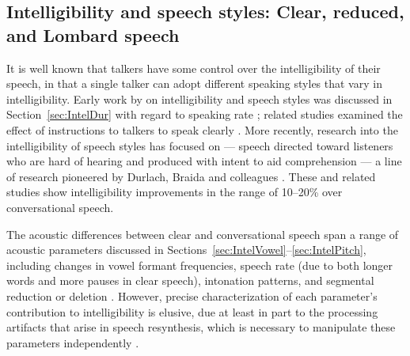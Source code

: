 
\subsection[Intelligibility and speech styles]{Intelligibility and speech styles: Clear, reduced, and Lombard speech\label{sec:SpeechStyle}}
It is well known that talkers have some control over the intelligibility of their speech, in that a single talker can adopt different speaking styles that vary in intelligibility.  Early work by \citeauthor*{Tolhurst1957a} on intelligibility and speech styles was discussed in Section~\ref{sec:IntelDur} with regard to speaking rate \citep{Tolhurst1957a}; related studies examined the effect of instructions to talkers to speak clearly \citep{Tolhurst1954, Tolhurst1955}.  More recently, research into the intelligibility of speech styles has focused on  — speech directed toward listeners who are hard of hearing and produced with intent to aid comprehension — a line of research pioneered by Durlach, Braida and colleagues \citep[\eg,][]{PichenyEtAl1985, PichenyEtAl1986, PichenyEtAl1989, UchanskiEtAl1996, KrauseBraida2004}.  These and related studies show intelligibility improvements in the range of 10–20\% over conversational speech.

The acoustic differences between clear and conversational speech span a range of acoustic parameters discussed in Sections~\ref{sec:IntelVowel}–\ref{sec:IntelPitch}, including changes in vowel formant frequencies, speech rate (due to both longer words and more pauses in clear speech), intonation patterns, and segmental reduction or deletion \citep[see][\intal]{PichenyEtAl1986, LiLoizou2008, SmiljanicBradlow2008, HazanBaker2011}.  However, precise characterization of each parameter’s contribution to intelligibility is elusive, due at least in part to the processing artifacts that arise in speech resynthesis, which is necessary to manipulate these parameters independently \citep[cf. discussions in][]{PichenyEtAl1989, UchanskiEtAl1996, LiuZeng2006, KrauseBraida2009}.

